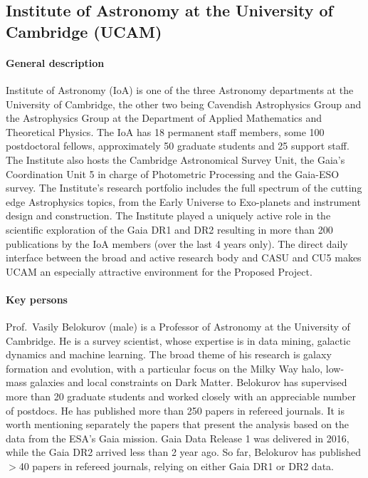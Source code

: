 \subsection{Institute of Astronomy at the University of Cambridge (UCAM)}
\label{sec:ucam}

\paragraph{General description}

Institute of Astronomy (IoA) is one of the three Astronomy departments at the University of Cambridge, the other two being Cavendish Astrophysics Group and the Astrophysics Group at the Department of Applied Mathematics and Theoretical Physics. The IoA has 18 permanent staff members, some 100 postdoctoral fellows, approximately 50 graduate students and 25 support staff. The Institute also hosts the Cambridge Astronomical Survey Unit, the Gaia’s Coordination Unit 5 in charge of Photometric Processing and the Gaia-ESO survey. The Institute’s research portfolio includes the full spectrum of the cutting edge Astrophysics topics, from the Early Universe to Exo-planets and instrument design and construction. The Institute played a uniquely active role in the scientific exploration of the Gaia DR1 and DR2 resulting in more than 200 publications by the IoA members (over the last 4 years only). The direct daily interface between the broad and active research body and CASU and CU5 makes UCAM an especially attractive environment for the Proposed Project.


\paragraph{Key persons}

Prof.~Vasily Belokurov (male) is a Professor of Astronomy at the University of Cambridge. He is a survey scientist, whose expertise is in data mining, galactic dynamics and machine learning. The broad theme of his research is galaxy formation and evolution, with a particular focus on the Milky Way halo, low-mass galaxies and local constraints on Dark Matter. Belokurov has supervised more than 20 graduate students and worked closely with an appreciable number of postdocs. He has published more than 250 papers in refereed journals. It is worth mentioning separately the papers that present the analysis based on the data from the ESA’s Gaia mission. Gaia Data Release 1 was delivered in 2016, while the Gaia DR2 arrived less than 2 year ago. So far, Belokurov has published $>$40 papers in refereed journals, relying on either Gaia DR1 or DR2 data.


